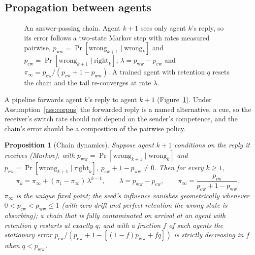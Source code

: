 \documentclass{article}
\newtheorem{proposition}{Proposition}
\newcommand{\pww}{p_{\mathrm{ww}}}
\newcommand{\pcw}{p_{\mathrm{cw}}}
\newcommand{\piinf}{\pi_{\infty}}
\begin{document}
\subsection{Propagation between agents}\label{sec:theory-agents}
\begin{figure}[t]\centering
{}
\caption{An answer-passing chain. Agent $k{+}1$ sees only agent $k$'s reply, so its error follows a two-state Markov step with rates measured pairwise, $\pww=\Pr[\text{wrong}_{k+1}\mid\text{wrong}_k]$ and $\pcw=\Pr[\text{wrong}_{k+1}\mid\text{right}_k]$; $\lambda=\pww-\pcw$ and $\piinf=\pcw/(\pcw+1-\pww)$. A trained agent with retention $q$ resets the chain and the tail re-converges at rate $\lambda$.}
\label{fig:chain-diagram}
\end{figure}
A pipeline forwards agent $k$'s reply to agent $k{+}1$ (Figure~\ref{fig:chain-diagram}). Under Assumption~\ref{ass:corpus} the forwarded reply is a named alternative, a cue, so the receiver's switch rate should not depend on the sender's competence, and the chain's error should be a composition of the pairwise policy.
\begin{proposition}[Chain dynamics]\label{prop:chain}
Suppose agent $k{+}1$ conditions on the reply it receives (Markov), with $\pww=\Pr[\mathrm{wrong}_{k+1}\mid\mathrm{wrong}_k]$ and $\pcw=\Pr[\mathrm{wrong}_{k+1}\mid\mathrm{right}_k]$, $\pcw+1-\pww\neq0$. Then for every $k\ge1$,
\[
\pi_k=\piinf+(\pi_1-\piinf)\,\lambda^{k-1},\qquad \lambda=\pww-\pcw,\qquad \piinf=\frac{\pcw}{\pcw+1-\pww},
\]
$\piinf$ is the unique fixed point; the seed's influence vanishes geometrically whenever $0<\pcw<\pww\le1$ (with zero drift and perfect retention the wrong state is absorbing); a chain that is fully contaminated on arrival at an agent with retention $q$ restarts at exactly $q$; and with a fraction $f$ of such agents the stationary error $\pcw/(\pcw+1-[(1-f)\pww+fq])$ is strictly decreasing in $f$ when $q<\pww$.
\end{proposition}
\end{document}
